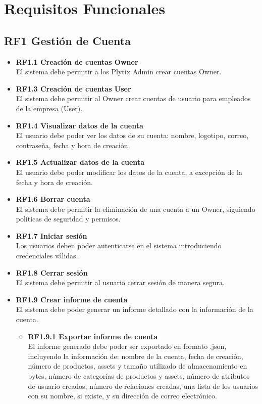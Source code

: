 \section*{Requisitos Funcionales}
\subsection*{RF1 Gestión de Cuenta}

\begin{itemize}
    \item \textbf{RF1.1 Creación de cuentas Owner} \\
    El sistema debe permitir a los Plytix Admin crear cuentas Owner.
    
    \item \textbf{RF1.3 Creación de cuentas User} \\
    El sistema debe permitir al Owner crear cuentas de usuario para empleados de la empresa (User).

    \item \textbf{RF1.4 Visualizar datos de la cuenta} \\
    El usuario debe poder ver los datos de su cuenta: nombre, logotipo, correo, contraseña, fecha y hora de creación.

    \item \textbf{RF1.5 Actualizar datos de la cuenta} \\
    El usuario debe poder modificar los datos de la cuenta, a excepción de la fecha y hora de creación.

    \item \textbf{RF1.6 Borrar cuenta} \\
    El sistema debe permitir la eliminación de una cuenta a un Owner, siguiendo políticas de seguridad y permisos.

    \item \textbf{RF1.7 Iniciar sesión} \\
    Los usuarios deben poder autenticarse en el sistema introduciendo credenciales válidas.

    \item \textbf{RF1.8 Cerrar sesión} \\
    El sistema debe permitir al usuario cerrar sesión de manera segura.

    \item \textbf{RF1.9 Crear informe de cuenta} \\
    El sistema debe poder generar un informe detallado con la información de la cuenta.
    \begin{itemize}
        \item \textbf{RF1.9.1 Exportar informe de cuenta} \\
        El informe generado debe poder ser exportado en formato .json, incluyendo la información  de: nombre de la cuenta, fecha de creación, número de productos, assets y tamaño utilizado de almacenamiento en bytes, número de categorías de productos y assets, número de atributos de usuario creados, número de relaciones creadas, una lista de los usuarios con su nombre, si existe, y su dirección de correo electrónico. %
    \end{itemize}



\end{itemize}
